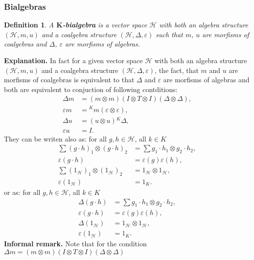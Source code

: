 \documentclass[a4paper]{article}
\newtheorem{definition}{Definition}
\begin{document}
\subsubsection{Bialgebras}
\begin{definition}
A \textbf{$\textbf{K}$-bialgebra} is a vector space $\mathcal{H}$ with both an algebra structure
$(\mathcal{H}, m, u)$ and a coalgebra structure $(\mathcal{H}, \Delta, \varepsilon)$ such that $m$, $u$
are morfisms of coalgebras and $\Delta$, $\varepsilon$ are morfisms of algebras.
\end{definition}
\textbf{Explanation. } In fact for a given vector space $\mathcal{H}$ with both an algebra structure
$(\mathcal{H}, m, u)$ and a coalgebra structure $(\mathcal{H}, \Delta, \varepsilon)$, the fact, that
$m$ and $u$ are morfisms of coalgebras is equivalent to that $\Delta$ and $\varepsilon$ are morfisms of
algebras and both are equivalent to conjuction of following contditions:
\begin{align*}
\Delta m &= (m\otimes m)(I \otimes T \otimes I)(\Delta \otimes \Delta), \\
\varepsilon m &= {^Km}(\varepsilon \otimes \varepsilon), \\
\Delta u &= (u \otimes u){^K\Delta}, \\
\varepsilon u &= I.
\end{align*}
They can be writen also as: for all $g, h \in \mathcal{H}$, all $k \in K$
\begin{align*}
\sum (g \cdot h)_1 \otimes (g \cdot h)_2 &= \sum g_1 \cdot h_1 \otimes g_2 \cdot h_2, \\
\varepsilon(g \cdot h) &= \varepsilon(g)\varepsilon(h), \\
\sum (1_\mathcal{H})_1 \otimes (1_\mathcal{H})_2 &= 1_\mathcal{H} \otimes 1_\mathcal{H}, \\
\varepsilon (1_\mathcal{H}) &= 1_K.
\end{align*}
or as: for all $g, h \in \mathcal{H}$, all $k \in K$
\begin{align*}
\Delta(g \cdot h) &= \sum g_1 \cdot h_1 \otimes g_2 \cdot h_2, \\
\varepsilon(g \cdot h) &= \varepsilon(g)\varepsilon(h), \\
\Delta (1_\mathcal{H}) &= 1_\mathcal{H} \otimes 1_\mathcal{H}, \\
\varepsilon (1_\mathcal{H}) &= 1_K.
\end{align*}
\textbf{Informal remark. } Note that for the condition
$\Delta m = (m\otimes m)(I \otimes T \otimes I)(\Delta \otimes \Delta)$
\end{document}
